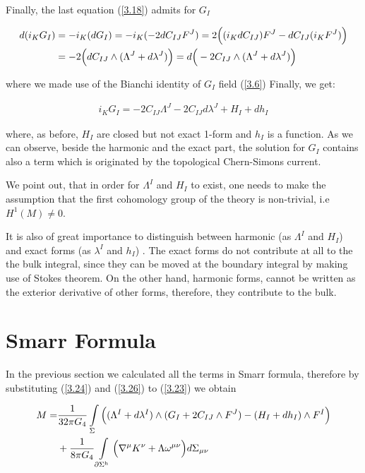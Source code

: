 \documentclass[a4paper,notitlepage]{report}
\begin{document}
Finally, the last equation (\ref{3.18}) admits for $G_I$

\begin{align} \label{3.25}
d(i_{K} G_I) &= - i_{K} (dG_I) = -  i_{K} (- 2 dC_{IJ} F^J) = 2 \Big( (i_{K}dC_{IJ}) F^J - dC_{IJ}  (i_{K}F^{J}) \Big)  \notag\\
&= -2 \Big( dC_{IJ} \wedge (\Lambda^J + d\lambda^J) \Big) = d \Big( -2C_{IJ} \wedge (\Lambda^J + d\lambda^J) \Big)
\end{align}

\vspace{0.5em}
where we made use of the Bianchi identity of $G_I$ field (\ref{3.6})
Finally, we get:

\begin{align} \label{3.26}
i_{K} G_I = -2C_{IJ} \Lambda^J - 2C_{IJ} d\lambda^J + H_{I} + dh_{I}
\end{align}

\vspace{0.5em}
where, as before, $H_{I}$ are closed but not exact 1-form and $h_{I}$ is a function. As we can observe, beside the harmonic and the exact part, the solution for $G_I$ contains also a term which is originated by the topological Chern-Simons current.

We point out, that in order for $\Lambda^I$ and $H_I$ to exist, one needs to make the assumption that the first cohomology group of the theory is non-trivial, i.e $H^1(M) \not= 0$.

It is also of great importance to distinguish between harmonic (as $\Lambda^I$ and $H_{I}$) and exact forms (as $\lambda^I$ and $h_{I}$) . The exact forms do not contribute at all to the the bulk integral, since they can be moved at the boundary integral by making use of Stokes theorem. On the other hand, harmonic forms, cannot be written as the exterior derivative of other forms, therefore, they contribute to the bulk.

\section{Smarr Formula}

In the previous section we calculated all the terms in Smarr formula, therefore by substituting (\ref{3.24}) and (\ref{3.26}) to (\ref{3.23}) we obtain

\begin{align} \label{3.27}
M =& \frac{1}{32\pi G_{4}} \int\limits_{\Sigma} \Big( (\Lambda^I + d\lambda^I)  \wedge (G_I + 2C_{IJ} \wedge F^J ) - (H_{I} + dh_{I}) \wedge F^I \Big) \notag\\
&+ \frac{1}{8\pi G_{4}} \int\limits_{\partial \Sigma^{\text{h}}} \Big( \nabla^{\mu} K^{\nu} + \Lambda \omega^{\mu\nu} \Big) d\Sigma_{\mu\nu}
\end{align}
\end{document}
